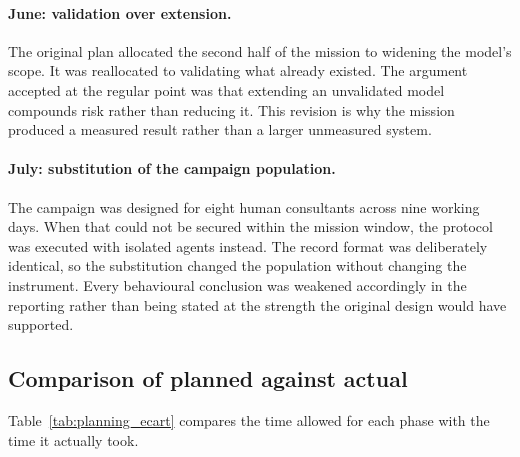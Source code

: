 \paragraph{June: validation over extension.}
The original plan allocated the second half of the mission to widening the model's scope. It
was reallocated to validating what already existed. The argument accepted at the regular
point was that extending an unvalidated model compounds risk rather than reducing it. This
revision is why the mission produced a measured result rather than a larger unmeasured
system.

\paragraph{July: substitution of the campaign population.}
The campaign was designed for eight human consultants across nine working days. When that
could not be secured within the mission window, the protocol was executed with isolated
agents instead. The record format was deliberately identical, so the substitution changed the
population without changing the instrument. Every behavioural conclusion was weakened
accordingly in the reporting rather than being stated at the strength the original design
would have supported.

\subsection*{Comparison of planned against actual}

Table~\ref{tab:planning_ecart} compares the time allowed for each phase with the time it
actually took.

